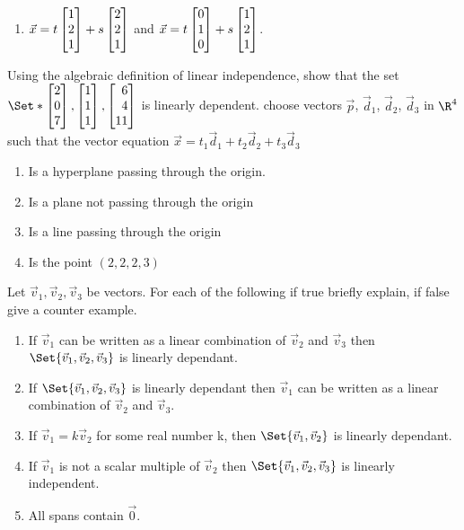 \begin{exercises}
\begin{problist}
\begin{enumerate}
			\item $\vec x = t\mat{1\\2\\1} + s\mat{2\\2\\1}$ and
						$\vec x = t\mat{0\\1\\0} + s\mat{1\\2\\1}$.
		\end{enumerate}
		\prob
		Using the algebraic definition of linear independence, show that the set
		$\Set*{\mat{2\\0\\7},\mat{1\\1\\1},\mat{6\\4\\11}}$ is linearly dependent.
		\prob
		choose vectors $\vec p$, $\vec d_1$, $\vec d_2$, $\vec d_3$ in $\R^4$ such that
		the vector equation $\vec x = t_1\vec d_1 + t_2\vec d_2 + t_3\vec d_3$
		\begin{enumerate}
			\item Is a hyperplane passing through the origin.
			\item Is a plane not passing through the origin
			\item Is a line passing through the origin
			\item Is the point $(2,2,2,3)$
		\end{enumerate}
		\prob
		Let $\vec v_1, \vec v_2, \vec v_3$ be vectors. For each of the following
		if true briefly explain, if false give a counter example.
		\begin{enumerate}
			\item If $\vec v_1$ can be written as a linear combination of $\vec v_2$ and
			$\vec v_3$ then $\Set{\vec v_1,\vec v_2,\vec v_3}$ is linearly dependant.
			\item If $\Set{\vec v_1,\vec v_2,\vec v_3}$ is linearly dependant then
			$\vec v_1$ can be written as a linear combination of $\vec v_2$ and $\vec v_3$.
			\item If $\vec v_1=k\vec v_2$ for some real number k, then $\Set{\vec v_1,\vec v_2}$
			is linearly dependant.
			\item If $\vec v_1$ is not a scalar multiple of $\vec v_2$ then
			$\Set{\vec v_1,\vec v_2,\vec v_3}$ is linearly independent.
			\item All spans contain $\vec 0$.
		\end{enumerate}
	\end{problist}
\end{exercises}
